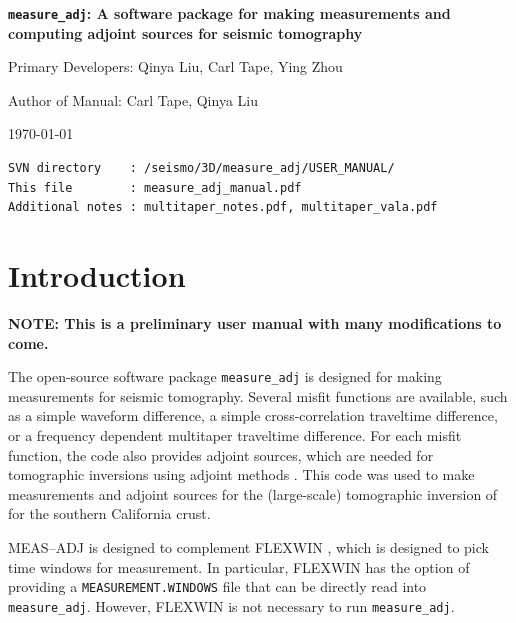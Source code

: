 \documentclass[11pt,titlepage,fleqn]{article}
\newcommand{\eg}{e.g.,}
\begin{document}

\begin{center}
{\bf \Large \verb+measure_adj+: A software package for making measurements and computing adjoint sources for seismic tomography}
\end{center}

\vspace{0.4cm}
\begin{spacing}{1.0}
\noindent Primary Developers: Qinya Liu, Carl Tape, Ying Zhou

\noindent Author of Manual: Carl Tape, Qinya Liu

\noindent \today

\noindent
\begin{verbatim}
SVN directory    : /seismo/3D/measure_adj/USER_MANUAL/
This file        : measure_adj_manual.pdf
Additional notes : multitaper_notes.pdf, multitaper_vala.pdf
\end{verbatim}

\tableofcontents

\end{spacing}


\pagebreak
\section{Introduction}

{\bf NOTE: This is a preliminary user manual with many modifications to come.}

The open-source software package \verb+measure_adj+ is designed for making measurements for seismic tomography. Several misfit functions are available, such as a simple waveform difference, a simple cross-correlation traveltime difference, or a frequency dependent multitaper traveltime difference. For each misfit function, the code also provides adjoint sources, which are needed for tomographic inversions using adjoint methods \cite[\eg][]{Tromp2005,LiuTromp2006,Tape2007}. This code was used to make measurements and adjoint sources for the (large-scale) tomographic inversion of \citet{Tape2009} for the southern California crust.

MEAS--ADJ is designed to complement FLEXWIN \citep{Maggi2009}, which is designed to pick time windows for measurement.  In particular, FLEXWIN has the option of providing a \verb+MEASUREMENT.WINDOWS+ file that can be directly read into \verb+measure_adj+.  However, FLEXWIN is not necessary to run \verb+measure_adj+.
\end{document}
